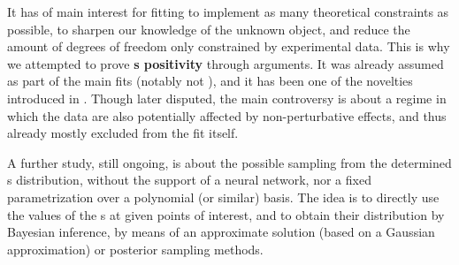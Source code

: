 It has of main interest for fitting to implement as many theoretical
constraints as possible, to sharpen our knowledge of the unknown object, and
reduce the amount of degrees of freedom only constrained by experimental data.
This is why we attempted to prove \textbf{\pdf{}s positivity}
 through \pqcd{} arguments.
It was already assumed as part of the main \pdf{} fits (notably not
), and it has been one of the novelties introduced in .
Though later disputed, the main controversy is about a regime in which the data
are also potentially affected by non-perturbative effects, and thus already
mostly excluded from the fit itself.

A further study, still ongoing, is about the possible sampling from the
determined \pdf{}s distribution, without the support of a neural network, nor a
fixed parametrization over a polynomial (or similar) basis.
The idea is to directly use the values of the \pdf{}s at given points of
interest, and to obtain their distribution by Bayesian inference, by means of
an approximate solution (based on a Gaussian approximation) or posterior
sampling methods.
